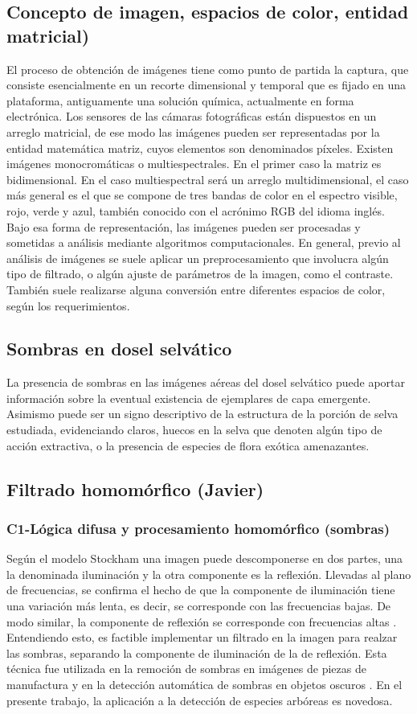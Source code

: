 \subsection{Concepto de imagen, espacios de color, entidad matricial)}
El proceso de obtención de imágenes tiene como punto de partida la captura, que consiste esencialmente en un recorte dimensional y temporal que es fijado en una plataforma, antiguamente una solución química, actualmente en forma electrónica. Los sensores de las cámaras fotográficas están dispuestos en un arreglo matricial, de ese modo las imágenes pueden ser representadas por la entidad matemática matriz, cuyos elementos son denominados píxeles. Existen imágenes monocromáticas o multiespectrales. En el primer caso la matriz es bidimensional. En el caso multiespectral será un arreglo multidimensional, el caso más general es el que se compone de tres bandas de color en el espectro visible, rojo, verde y azul, también conocido con el acrónimo RGB del idioma inglés. Bajo esa forma de representación, las imágenes pueden ser procesadas y sometidas a análisis mediante algoritmos computacionales. En general, previo al análisis de imágenes se suele aplicar un preprocesamiento que involucra algún tipo de filtrado, o algún ajuste de parámetros de la imagen, como el contraste. También suele realizarse alguna conversión entre diferentes espacios de color, según los requerimientos.
\subsection{Sombras en dosel selvático}
La presencia de sombras en las imágenes aéreas del dosel selvático puede aportar información sobre la eventual existencia de ejemplares de capa emergente. Asimismo puede ser un signo descriptivo de la estructura de la porción de selva estudiada, evidenciando claros, huecos en la selva que denoten algún tipo de acción extractiva, o la presencia de especies de flora exótica amenazantes.
\subsection{Filtrado homomórfico (Javier)}
\subsubsection{C1-Lógica difusa y procesamiento homomórfico (sombras)}
Según el modelo Stockham \cite{stockham_image_1972} una imagen puede descomponerse en dos partes, una la denominada iluminación y la otra componente es la reflexión. Llevadas al plano de frecuencias, se confirma el hecho de que la componente de iluminación tiene una variación más lenta, es decir, se corresponde con las frecuencias bajas. De modo similar, la componente de reflexión se corresponde con frecuencias altas \cite{oppenheim_nonlinear_1968}. Entendiendo esto, es factible implementar un filtrado en la imagen para realzar las sombras, separando la componente de iluminación de la de reflexión. Esta técnica fue utilizada en la remoción de sombras en imágenes de piezas de manufactura \cite{yang_research_2012} y en la detección automática de sombras en objetos oscuros \cite{etemadnia_automatic_2003}. En el presente trabajo, la aplicación a la detección de especies arbóreas es novedosa. 
